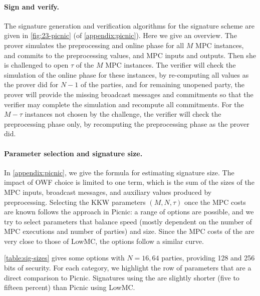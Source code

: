 \paragraph{Sign and verify.} 
The signature generation and verification algorithms for the
\ttOWF  signature scheme are given in \cref{fig:23-picnic} (of \cref{appendix:picnic}).
Here we give an overview. The
prover simulates the preprocessing and online phase for all $M$ MPC instances, and commits
to the preprocessing values, and MPC inputs and outputs.
Then she is challenged to open $\tau$ of the $M$ MPC instances.
The verifier will check the simulation of the online phase for these instances,
by re-computing all values as the prover did for $N-1$ of the parties, and for
remaining unopened party, the prover will provide the missing broadcast messages
and commitments so that the verifier may complete the simulation and recompute all
commitments. 
For the $M-\tau$ instances not chosen by the challenge, the verifier will check
the preprocessing phase only, by recomputing the preprocessing phase as the prover did. 

\newcommand{\textunderbrace}[2]{{%
  \underbrace{#1}_{\text{#2}}
}}

\paragraph{Parameter selection and signature size.}
In \cref{appendix:picnic}, we give the formula for estimating signature size.
The impact of OWF choice is limited to one term, which is the sum of
the sizes of the MPC inputs, broadcast messages, and auxiliary values produced
by preprocessing.  Selecting the KKW parameters $(M, N, \tau)$ once the MPC costs
are known follows the approach in Picnic: a range of options are possible, and
we try to select parameters that balance speed (mostly dependent on the number of MPC executions and number of 
parties) and size.  Since the MPC costs of the \ttOWF are very close to those
of LowMC, the options follow a similar curve. 

\cref{table:sig-sizes} gives some options with $N=16, 64$ parties,
providing 128 and 256 bits of security. For each category, we highlight the row
of \ttOWF parameters that are a direct comparison to Picnic.  Signatures using
the \ttOWF are slightly shorter (five to fifteen percent) than Picnic using
LowMC. 


